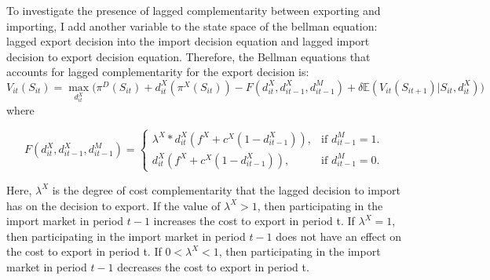 \documentclass[12pt]{article}
\begin{document}
To investigate the presence of lagged complementarity between exporting and
importing, I add another variable to the state space of the bellman equation: lagged export
decision into the import decision equation and lagged import decision
to export decision equation. Therefore, the Bellman equations that
accounts for lagged complementarity for the export decision is: 
\begin{equation}
V_{it}(S_{it})= \underset{d_{it}^{X}}{\max} \Big(\pi^{D}(S_{it}) + d_{it}^{X}(\pi^{X}(S_{it})) - F(d_{it}^{X},d_{it-1}^{X}, d_{it-1}^{M})
  + \delta \mathbb{E} (V_{it}(S_{it+1})|S_{it}, d_{it}^{X}) \Big)
\end{equation}
where 
 
\begin{equation}
  F(d_{it}^{X},d_{it-1}^{X}, d_{it-1}^{M})=\begin{cases}
   \lambda^{X} * d_{it}^{X}( f^{X} +c^{X}(1-d_{it-1}^{X})), & \text{if $d_{it-1}^{M}= 1$}.\\
   d_{it}^{X}( f^{X} +c^{X}(1-d_{it-1}^{X})) , & \text{if $d_{it-1}^{M}= 0$}.
  \end{cases}
\end{equation}

Here, $\lambda^{X}$ is the degree of cost complementarity that the
lagged decision to import has on the decision to export. If the value
of $\lambda^{X} > 1$, then participating in the import market in
period $t-1$ increases the cost to export in period t. If
$\lambda^{X}=1$, then participating in the import market in
period $t-1$ does not have an effect on the cost to export in period t.
If $0<\lambda^{X}< 1$,     then participating in the import market in
period $t-1$ decreases the cost to export in period t.
\end{document}
